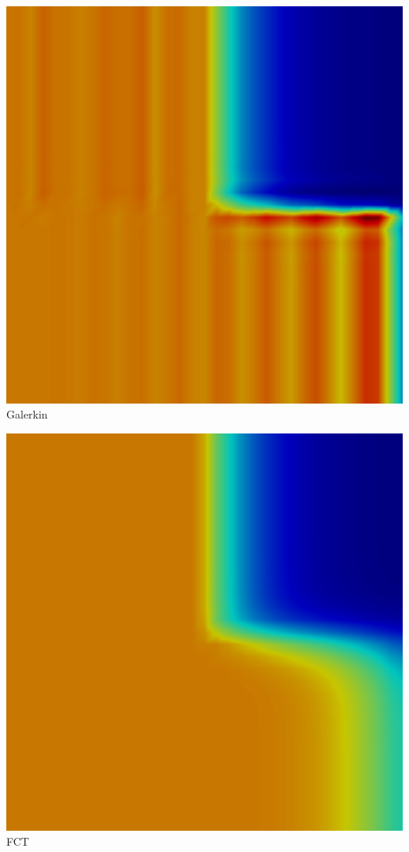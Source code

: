 \begin{minipage}[t]{0.5\linewidth}
  \centering
  \includegraphics[width=\columnwidth]{figures/Gal2d.png}
  Galerkin
\end{minipage}
\begin{minipage}[t]{0.5\linewidth}
  \centering
  \includegraphics[width=\columnwidth]{figures/GalFCT2d.png}
  FCT
\end{minipage}

